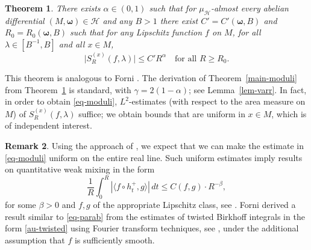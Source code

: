 \documentclass[10pt]{amsart}
\let\mathcal\mathscr
\theoremstyle{plain}
\newtheorem{theorem}{Theorem}[section]
\theoremstyle{definition}
\newtheorem{remark}[theorem]{Remark}
\newcommand{\omb}{\boldsymbol \omega}
\let\lam\lambda
\let\gam\gamma
\newcommand{\HH}{\mathcal{H}}
\begin{document}
\begin{theorem} \label{th-twisted}
There exists $\alpha\in (0,1)$ such that for $\mu_\HH$-almost every abelian differential $(M, \omb)\in \HH$ and any $B>1$ there exist $C'=C'(\omb,B)$ and $R_0 = R_0(\omb,B)$ such that for any Lipschitz function $f$ on $M$, for all $\lam\in [B^{-1},B]$ and all $x\in M$,
\begin{equation} \label{au-twisted}
\bigl|S_R^{(x)}(f,\lam)\bigr| \le C' R^\alpha\quad\text{for all }R\ge R_0.
\end{equation}
\end{theorem}

This theorem is analogous to Forni \cite[Th.\,1.6]{Forni2}.
The derivation of Theorem~\ref{main-moduli} from Theorem~\ref{th-twisted} is standard, with $\gam = 2(1-\alpha)$; see Lemma~\ref{lem-varr}. In fact, in order to obtain \eqref{eq-moduli}, $L^2$-estimates (with respect to
the area measure on $M$) of $S_R^{(x)}(f,\lam)$ suffice; we obtain bounds that are uniform in $x\in M$, which is of independent interest.

\begin{remark}
Using the approach of \cite{BuSo18b}, we expect that we can make the estimate in \eqref{eq-moduli} uniform
on the entire real line.
Such uniform estimates imply results on quantitative weak mixing in the form
\begin{equation} \label{eq-parab}
\frac{1}{R} \int_0^R \left|\langle f\circ h_t^+, g\rangle\right|\,dt \le C(f,g) \cdot R^{-\beta},
\end{equation}
for some $\beta>0$ and $f,g$ of the appropriate Lipschitz class, see \cite[Th.\,1.1]{BuSo18b}.
Forni \cite[Cor.\,1.8]{Forni2} derived a result similar to \eqref{eq-parab} from the estimates of twisted Birkhoff integrals in the form \eqref{au-twisted} using Fourier transform techniques, see
\cite[Lem.\,9.3]{Forni2}, under the additional assumption that $f$ is sufficiently smooth.
\end{remark}
\end{document}
